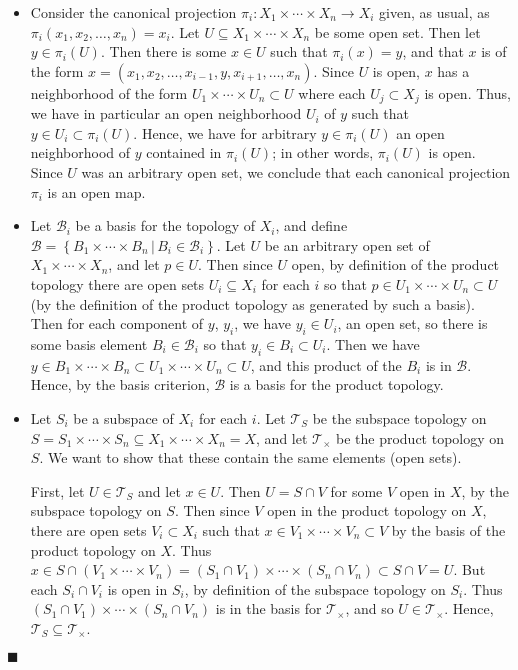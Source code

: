 \documentclass[12pt]{article}
\renewcommand{\qed}{\hfill$\blacksquare$}
\renewenvironment{proof}{\begin{addmargin}[1em]{0em}\begin{newproof}}{\end{newproof}\end{addmargin}\qed}
\begin{document}
\begin{proof}
\begin{itemize}
	\item Consider the canonical projection $\pi_i: X_1 \times \cdots \times X_n \rightarrow X_i$ given, as usual, as $\pi_i \left(x_1,x_2,\ldots,x_n\right) = x_i$. Let $U \subseteq X_1\times \cdots \times X_n$ be some open set. Then let $y \in \pi_i\left(U\right)$. Then there is some $x \in U$ such that $\pi_i\left(x\right) = y$, and that $x$ is of the form $x = \left(x_1,x_2,\ldots, x_{i-1},y,x_{i+1},\ldots,x_n\right)$. Since $U$ is open, $x$ has a neighborhood of the form $U_1 \times \cdots \times U_n \subset U$ where each $U_j \subset X_j$ is open. Thus, we have in particular an open neighborhood $U_i$ of $y$ such that $y \in U_i \subset \pi_i\left(U\right)$. Hence, we have for arbitrary $y \in \pi_i\left(U\right)$ an open neighborhood of $y$ contained in $\pi_i\left(U\right)$; in other words, $\pi_i\left(U\right)$ is open. Since $U$ was an arbitrary open set, we conclude that each canonical projection $\pi_i$ is an open map.
	\item Let $\mathcal{B}_i$ be a basis for the topology of $X_i$, and define $\mathcal{B} = \left\{B_1 \times \cdots \times B_n \, | \, B_i \in \mathcal{B}_i\right\}$. Let $U$ be an arbitrary open set of $X_1\times \cdots \times X_n$, and let $p \in U$. Then since $U$ open, by definition of the product topology there are open sets $U_i \subseteq X_i$ for each $i$ so that $p \in U_1 \times \cdots \times U_n \subset U$ (by the definition of the product topology as generated by such a basis). Then for each component of $y$, $y_i$, we have $y_i \in U_i$, an open set, so there is some basis element $B_i \in \mathcal{B}_i$ so that $y_i \in B_i \subset U_i$. Then we have $y \in B_1 \times \cdots \times B_n \subset U_1 \times \cdots \times U_n \subset U$, and this product of the $B_i$ is in $\mathcal{B}$. Hence, by the basis criterion, $\mathcal{B}$ is a basis for the product topology.
	\item Let $S_i$ be a subspace of $X_i$ for each $i$. Let $\mathcal{T}_S$ be the subspace topology on $S = S_1 \times \cdots \times S_n \subseteq X_1 \times \cdots \times X_n = X$, and let $\mathcal{T}_{\times}$ be the product topology on $S$. We want to show that these contain the same elements (open sets).

	First, let $U \in \mathcal{T}_{S}$ and let $x \in U$. Then $U = S\cap V$ for some $V$ open in $X$, by the subspace topology on $S$. Then since $V$ open in the product topology on $X$, there are open sets $V_i\subset X_i$ such that $x \in V_1 \times \cdots \times V_n \subset V$ by the basis of the product topology on $X$. Thus $x \in S\cap \left(V_1 \times \cdots \times V_n\right) = \left(S_1 \cap V_1\right)\times \cdots \times \left(S_n \cap V_n\right) \subset S\cap V = U$. But each $S_i\cap V_i$ is open in $S_i$, by definition of the subspace topology on $S_i$. Thus $\left(S_1\cap V_1\right)\times \cdots \times \left(S_n\cap V_n\right) $ is in the basis for $\mathcal{T}_{\times}$, and so $U\in \mathcal{T}_{\times}$. Hence, $\mathcal{T}_S \subseteq \mathcal{T}_{\times}$.


\end{itemize}
\end{proof}
\end{document}
